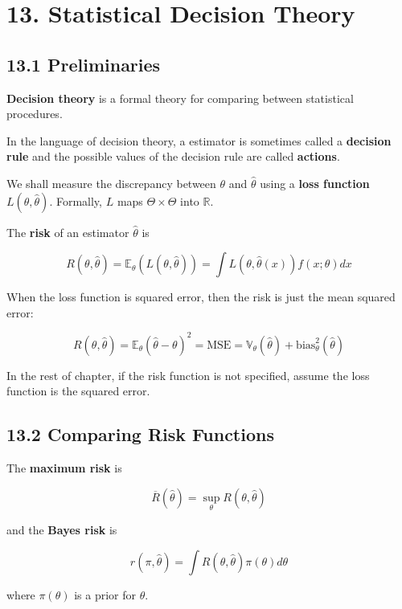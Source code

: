 \section*{13. Statistical Decision Theory}\label{statistical-decision-theory}

\subsection*{13.1 Preliminaries}\label{preliminaries}

\textbf{Decision theory} is a formal theory for comparing between
statistical procedures.

In the language of decision theory, a estimator is sometimes called a
\textbf{decision rule} and the possible values of the decision rule are
called \textbf{actions}.

We shall measure the discrepancy between \(\theta\) and \(\hat{\theta}\)
using a \textbf{loss function} \(L(\theta, \hat{\theta})\). Formally,
\(L\) maps \(\Theta \times \Theta\) into \(\mathbb{R}\).

The \textbf{risk} of an estimator \(\hat{\theta}\) is

\[ R(\theta, \hat{\theta}) = \mathbb{E}_\theta \left( L(\theta, \hat{\theta}) \right)
= \int L(\theta, \hat{\theta}(x)) f(x; \theta) dx\]

When the loss function is squared error, then the risk is just the mean
squared error:

\[R(\theta, \hat{\theta}) = \mathbb{E}_\theta(\hat{\theta} - \theta)^{2} = \text{MSE} = \mathbb{V}_\theta(\hat{\theta}) + \text{bias}_\theta^{2}(\hat{\theta})\]

In the rest of chapter, if the risk function is not specified, assume
the loss function is the squared error.

\subsection*{13.2 Comparing Risk
Functions}\label{comparing-risk-functions}

The \textbf{maximum risk} is

\[ \overline{R}(\hat{\theta}) = \sup_\theta R(\theta, \hat{\theta})\]

and the \textbf{Bayes risk} is

\[ r(\pi, \hat{\theta}) = \int R(\theta, \hat{\theta}) \pi(\theta) d\theta\]

where \(\pi(\theta)\) is a prior for \(\theta\).

